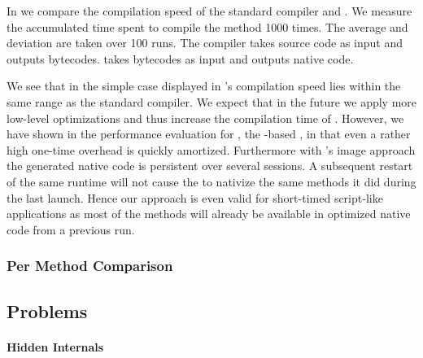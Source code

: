 \noindent In  we compare the compilation speed of the standard \PH compiler and \NBJ.
We measure the accumulated time spent to compile the method 1000 times.
The average and deviation are taken over 100 runs. 
The \PH compiler takes source code as input and outputs \ST bytecodes.
\NBJ takes bytecodes as input and outputs native code.

We see that in the simple case displayed in  \NBJ's compilation speed lies within the same range as the standard \ST compiler.
We expect that in the future we apply more low-level optimizations and thus increase the compilation time of \NBJ.
However, we have shown in the performance evaluation for \NB, the \B-based \FFI, in  that even a rather high one-time overhead is quickly amortized.
Furthermore with \ST's image approach the generated native code is persistent over several sessions.
A subsequent restart of the same runtime will not cause the \JIT to nativize the same methods it did during the last launch.
Hence our approach is even valid for short-timed script-like applications as most of the methods will already be available in optimized native code from a previous run.

\subsubsection*{Per Method Comparison}


\subsection{Problems}
\paragraph{Hidden \VM Internals}
\\
 \\
 \\



